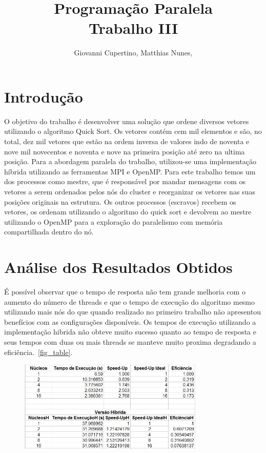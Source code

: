 \documentclass[11pt]{IEEEtran}
\title{Programação Paralela\\ Trabalho III}
\author{Giovanni Cupertino, Matthias Nunes, \IEEEmembership{Usuário pp12820}}
\begin{document}
\maketitle

\section{Introdução}

	O objetivo do trabalho é desenvolver uma solução que ordene diversos vetores
	utilizando o algoritmo Quick Sort.  Os vetores contém cem mil elementos e
	são, no total, dez mil vetores que estão na ordem inversa de valores indo de
	noventa e nove mil novecentos e noventa e nove na primeira posição até zero
	na ultima posição.  Para a abordagem paralela do trabalho, utilizou-se uma
	implementação híbrida utilizando as ferramentas MPI e OpenMP\@. Para este 
	trabalho temos um dos processos como mestre, que é responsável por mandar 
	mensagens com os vetores a serem ordenados pelos nós do cluster e reorganizar
	os vetores nas suas posições originais na estrutura. Os outros processos 
	(escravos) recebem os vetores, os ordenam utilizando o algoritmo do quick sort
	e devolvem ao mestre utilizando o OpenMP para a exploração do paralelismo com 
	memória compartilhada dentro do nó.

\section{Análise dos Resultados Obtidos}

	É possível observar que o tempo de resposta não tem grande melhoria com o
	aumento do número de threads e que o tempo de execução do algoritmo mesmo 
	utilizando mais nós do que quando realizado no primeiro trabalho não apresentou
	benefícios com as configurações disponíveis. Os tempos de execução utilizando
	a implementação hibrida não obteve muito sucesso quanto ao tempo de resposta
	e seus tempos com duas ou mais threads se manteve muito proxima degradando a
	eficiência.~\ref{fig_table}.

	\begin{figure}[H]
		\centering
		\includegraphics[width=88mm]{table.png}
		\label{fig_graph}
	\end{figure}
\end{document}
